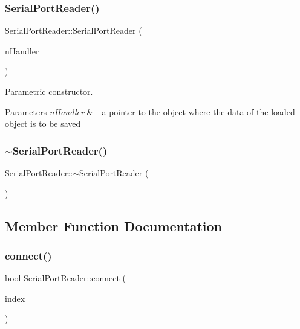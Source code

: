 \subsubsection{Serial\+Port\+Reader()}
{\footnotesize\ttfamily Serial\+Port\+Reader\+::\+Serial\+Port\+Reader (\begin{DoxyParamCaption}\item[{\textbf{ Measurement\+Handler} $\ast$}]{n\+Handler }\end{DoxyParamCaption})}



Parametric constructor. 


\begin{DoxyParams}{Parameters}
{\em n\+Handler} & -\/ a pointer to the object where the data of the loaded object is to be saved \\
\hline
\end{DoxyParams}
\mbox{\label{class_serial_port_reader_a7f01c445adf0d64d8acd67cd4fcd3b21}} 
\subsubsection{$\sim$\+Serial\+Port\+Reader()}
{\footnotesize\ttfamily Serial\+Port\+Reader\+::$\sim$\+Serial\+Port\+Reader (\begin{DoxyParamCaption}{ }\end{DoxyParamCaption})}



\subsection{Member Function Documentation}
\mbox{\label{class_serial_port_reader_ad00028795b4f33ffb0a97cd76726c4fd}} 
\subsubsection{connect()}
{\footnotesize\ttfamily bool Serial\+Port\+Reader\+::connect (\begin{DoxyParamCaption}\item[{quint32}]{index }\end{DoxyParamCaption})}



